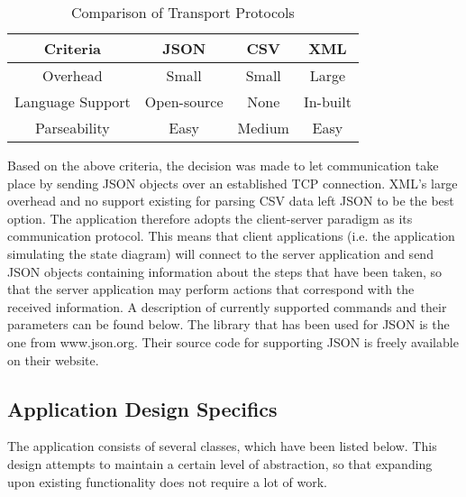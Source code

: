 \documentclass[11pt,a4paper]{article}
\begin{document}
\begin{table}[h]
	\begin{center}
		\begin{tabular}{| c || c | c | c |}
			\hline
			Criteria & JSON & CSV & XML \\ \hline
			Overhead & Small & Small & Large \\ \hline
			Language Support & Open-source & None & In-built \\ \hline
			Parseability & Easy & Medium & Easy \\ \hline
		\end{tabular}
		\caption{Comparison of Transport Protocols}
	\end{center}
\end{table}
Based on the above criteria, the decision was made to let communication take place by sending JSON objects over an established TCP connection. XML's large overhead and no support existing for parsing CSV data left JSON to be the best option. The application therefore adopts the client-server paradigm as its communication protocol. This means that client applications (i.e. the application simulating the state diagram) will connect to the server application and send JSON objects containing information about the steps that have been taken, so that the server application may perform actions that correspond with the received information. A description of currently supported commands and their parameters can be found below.
The library that has been used for JSON is the one from www.json.org. Their source code for supporting JSON is freely available on their website.
\subsection{Application Design Specifics}
The application consists of several classes, which have been listed below. This design attempts to maintain a certain level of abstraction, so that expanding upon existing functionality does not require a lot of work.
\end{document}
